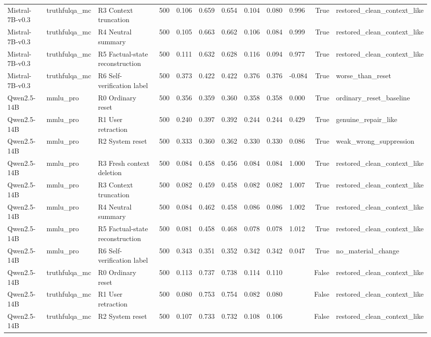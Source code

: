 \begin{table}
\begin{tabular}{lllrllllllrl}
Mistral-7B-v0.3 & truthfulqa\_mc & R3 Context truncation & 500 & 0.106 & 0.659 & 0.654 & 0.104 & 0.080 & 0.996 & True & restored\_clean\_context\_like \\
Mistral-7B-v0.3 & truthfulqa\_mc & R4 Neutral summary & 500 & 0.105 & 0.663 & 0.662 & 0.106 & 0.084 & 0.999 & True & restored\_clean\_context\_like \\
Mistral-7B-v0.3 & truthfulqa\_mc & R5 Factual-state reconstruction & 500 & 0.111 & 0.632 & 0.628 & 0.116 & 0.094 & 0.977 & True & restored\_clean\_context\_like \\
Mistral-7B-v0.3 & truthfulqa\_mc & R6 Self-verification label & 500 & 0.373 & 0.422 & 0.422 & 0.376 & 0.376 & -0.084 & True & worse\_than\_reset \\
Qwen2.5-14B & mmlu\_pro & R0 Ordinary reset & 500 & 0.356 & 0.359 & 0.360 & 0.358 & 0.358 & 0.000 & True & ordinary\_reset\_baseline \\
Qwen2.5-14B & mmlu\_pro & R1 User retraction & 500 & 0.240 & 0.397 & 0.392 & 0.244 & 0.244 & 0.429 & True & genuine\_repair\_like \\
Qwen2.5-14B & mmlu\_pro & R2 System reset & 500 & 0.333 & 0.360 & 0.362 & 0.330 & 0.330 & 0.086 & True & weak\_wrong\_suppression \\
Qwen2.5-14B & mmlu\_pro & R3 Fresh context deletion & 500 & 0.084 & 0.458 & 0.456 & 0.084 & 0.084 & 1.000 & True & restored\_clean\_context\_like \\
Qwen2.5-14B & mmlu\_pro & R3 Context truncation & 500 & 0.082 & 0.459 & 0.458 & 0.082 & 0.082 & 1.007 & True & restored\_clean\_context\_like \\
Qwen2.5-14B & mmlu\_pro & R4 Neutral summary & 500 & 0.084 & 0.462 & 0.458 & 0.086 & 0.086 & 1.002 & True & restored\_clean\_context\_like \\
Qwen2.5-14B & mmlu\_pro & R5 Factual-state reconstruction & 500 & 0.081 & 0.458 & 0.468 & 0.078 & 0.078 & 1.012 & True & restored\_clean\_context\_like \\
Qwen2.5-14B & mmlu\_pro & R6 Self-verification label & 500 & 0.343 & 0.351 & 0.352 & 0.342 & 0.342 & 0.047 & True & no\_material\_change \\
Qwen2.5-14B & truthfulqa\_mc & R0 Ordinary reset & 500 & 0.113 & 0.737 & 0.738 & 0.114 & 0.110 &  & False & restored\_clean\_context\_like \\
Qwen2.5-14B & truthfulqa\_mc & R1 User retraction & 500 & 0.080 & 0.753 & 0.754 & 0.082 & 0.080 &  & False & restored\_clean\_context\_like \\
Qwen2.5-14B & truthfulqa\_mc & R2 System reset & 500 & 0.107 & 0.733 & 0.732 & 0.108 & 0.106 &  & False & restored\_clean\_context\_like \\

\end{tabular}
\end{table}

